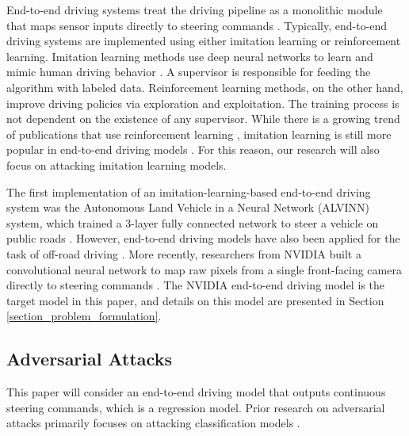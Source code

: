 End-to-end driving systems treat the driving pipeline as a monolithic module that maps sensor inputs directly to steering commands \citep{Yurtsever2020}. Typically, end-to-end driving systems are implemented using either imitation learning or reinforcement learning. Imitation learning methods use deep neural networks to learn and mimic human driving behavior \citep{chen2022learning}. A supervisor is responsible for feeding the algorithm with labeled data. Reinforcement learning methods, on the other hand, improve driving policies via exploration and exploitation. The training process is not dependent on the existence of any supervisor. While there is a growing trend of publications that use reinforcement learning \citep{Chopra2020}\citep{perez2022deep}\citep{1286725}\citep{jaafra2019seeking}\citep{Chitta2021ICCV}, imitation learning is still more popular in end-to-end driving models \citep{tampuu2020survey}\citep{Prakash2021CVPR}\citep{Chitta2022PAMI}\citep{wu2022trajectory}. For this reason, our research will also focus on attacking imitation learning models.

The first implementation of an imitation-learning-based end-to-end driving system was the Autonomous Land Vehicle in a Neural Network (ALVINN) system, which trained a 3-layer fully connected network to steer a vehicle on public roads \citep{NIPS1988_812b4ba2}. However, end-to-end driving models have also been applied for the task of off-road driving \citep{NIPS2005_fdf1bc56}. More recently, researchers from NVIDIA built a convolutional neural network to map raw pixels from a single front-facing camera directly to steering commands \citep{bojarski2016end}. The NVIDIA end-to-end driving model is the target model in this paper, and details on this model are presented in Section \ref{section_problem_formulation}.

\subsection{Adversarial Attacks}
\label{adversarial_attacks}

This paper will consider an end-to-end driving model that outputs continuous steering commands, which is a regression model. Prior research on adversarial attacks primarily focuses on attacking classification models \citep{li2022review} \citep{zhang2021evaluating}\citep{boloor2019simple}\citep{abideen2022a3d}.

